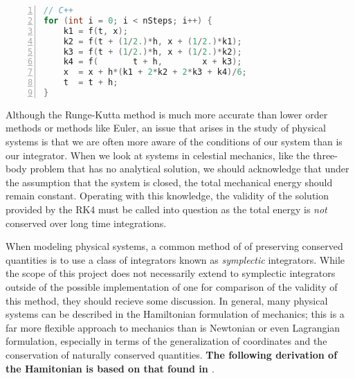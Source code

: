 \documentclass[onecolumn,titlepage,letterpaper,10pt]{article}
\begin{document}
\begin{lstlisting}[language=c++, numbers=left, caption=Fourth-order Runge-Kutta (RK4),
label=listing_RK4, float=h!]
// C++
for (int i = 0; i < nSteps; i++) {
    k1 = f(t, x);
    k2 = f(t + (1/2.)*h, x + (1/2.)*k1);
    k3 = f(t + (1/2.)*h, x + (1/2.)*k2);
    k4 = f(       t + h,        x + k3);
    x  = x + h*(k1 + 2*k2 + 2*k3 + k4)/6;
    t  = t + h;
}
\end{lstlisting}

Although the Runge-Kutta method is much more accurate than lower order methods
or methods like Euler, an issue that arises in the study of physical
systems is that we are often more aware of the conditions of our system than is
our integrator. When we look at systems in celestial mechanics, like the
three-body problem that has no analytical solution, we should
acknowledge that under the assumption that the system is closed, the total
mechanical energy should remain constant. Operating with this
knowledge, the validity of the solution provided by the RK4 must be called into
question as the total energy is \textit{not} conserved over long time
integrations. \cite{holmes_2018}

When modeling physical systems, a common method of of preserving conserved
quantities is to use a class of integrators known as \textit{symplectic}
integrators. While the scope of this project does not necessarily extend
to symplectic integrators outside of the possible implementation of one for
comparison of the validity of this method, they should recieve some discussion.
In general, many physical systems can be described in the Hamiltonian
formulation of mechanics; this is a far more flexible approach to mechanics than
is Newtonian or even Lagrangian formulation, especially in terms of the
generalization of coordinates and the conservation of naturally conserved
quantities. \textbf{The following derivation of the Hamitonian is based on that found in
    \citet{taylor_2005}}.
\end{document}
